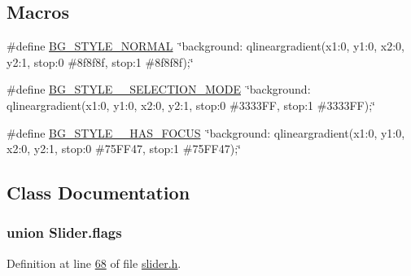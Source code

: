 \subsection*{Macros}
\begin{DoxyCompactItemize}
\item 
\#define \hyperlink{a00078_a0a9d6eabafd981a8b48b343249428077}{B\+G\+\_\+\+S\+T\+Y\+L\+E\+\_\+\+N\+O\+R\+M\+A\+L}~\char`\"{}background\+: qlineargradient(x1\+:0, y1\+:0, x2\+:0, y2\+:1, stop\+:0 \#8f8f8f, stop\+:1 \#8f8f8f);\char`\"{}
\item 
\#define \hyperlink{a00078_a0d978e946366d0eb299bb966cf8a52e9}{B\+G\+\_\+\+S\+T\+Y\+L\+E\+\_\+\+\_\+\+S\+E\+L\+E\+C\+T\+I\+O\+N\+\_\+\+M\+O\+D\+E}~\char`\"{}background\+: qlineargradient(x1\+:0, y1\+:0, x2\+:0, y2\+:1, stop\+:0 \#3333\+F\+F, stop\+:1 \#3333\+F\+F);\char`\"{}
\item 
\#define \hyperlink{a00078_a3b78c22b908aee9d7cda0ff6240570fd}{B\+G\+\_\+\+S\+T\+Y\+L\+E\+\_\+\+\_\+\+H\+A\+S\+\_\+\+F\+O\+C\+U\+S}~\char`\"{}background\+: qlineargradient(x1\+:0, y1\+:0, x2\+:0, y2\+:1, stop\+:0 \#75\+F\+F47, stop\+:1 \#75\+F\+F47);\char`\"{}
\end{DoxyCompactItemize}


\subsection{Class Documentation}
\label{dd/df3/a00219}
\hypertarget{a00078_dd/df3/a00219}{}
\subsubsection{union Slider.\+flags}


Definition at line \hyperlink{a00078_source_l00068}{68} of file \hyperlink{a00078_source}{slider.\+h}.



